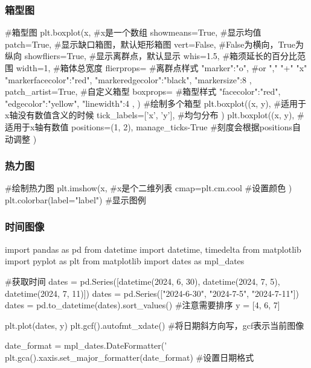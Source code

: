     \subsubsection{箱型图}
      \begin{codeblock}[language=python, caption={box plot}]
        #箱型图
        plt.boxplot(x, #x是一个数组
                    showmeans=True, #显示均值
                    patch=True, #显示缺口箱图，默认矩形箱图
                    vert=False, #False为横向，True为纵向
                    showfliers=True, #显示离群点，默认显示
                    whis=1.5, #箱须延长的百分比范围
                    width=1, #箱体总宽度
                    flierprops={ #离群点样式
                        "marker":"o", #or "," "+" "x"
                        "markerfacecolor":"red",
                        "markeredgecolor":"black",
                        "markersize":8
                    }, 
                    patch_artist=True, #自定义箱型
                    boxprops={ #箱型样式
                        "facecolor":"red",
                        "edgecolor":"yellow",
                        "linewidth":4
                    },
        ) 
        #绘制多个箱型
        plt.boxplot((x, y), #适用于x轴没有数值含义的时候
                    tick_labels=['x', 'y'], #均匀分布
        )
        plt.boxplot((x, y), #适用于x轴有数值
                    positions=(1, 2), 
                    manage_ticks-True #刻度会根据positions自动调整
        )
      \end{codeblock}

    \subsubsection{热力图}
      \begin{codeblock}[language=python, caption={heat map}]
        #绘制热力图
        plt.imshow(x, #x是个二维列表
                  cmap=plt.cm.cool #设置颜色
        ) 
        plt.colorbar(label="label") #显示图例
      \end{codeblock}
    
    \subsubsection{时间图像}
      \begin{codeblock}[language=python, caption={Plotting Time Series Data}]
        import pandas as pd
        from datetime import datetime, timedelta
        from matplotlib import pyplot as plt
        from matplotlib import dates as mpl_dates

        #获取时间
        dates = pd.Series([datetime(2024, 6, 30), datetime(2024, 7, 5), datetime(2024, 7, 11)])
        dates = pd.Series(["2024-6-30", "2024-7-5", "2024-7-11"])
        dates = pd.to_datetime(dates).sort_values() #注意需要排序
        y = [4, 6, 7]

        plt.plot(dates, y)
        plt.gcf().autofmt_xdate() #将日期斜方向写，gcf表示当前图像

        date_format = mpl_dates.DateFormatter('%
        plt.gca().xaxis.set_major_formatter(date_format) #设置日期格式
      \end{codeblock}


